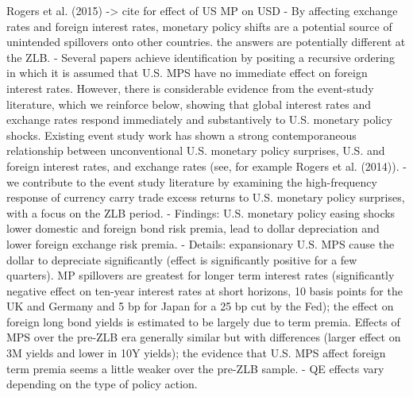 Rogers et al. (2015) -> cite for effect of US MP on USD
- By affecting exchange rates and foreign interest rates, monetary policy shifts are a
potential source of unintended spillovers onto other countries. the answers are potentially different at the ZLB.
- Several papers achieve identification by positing a recursive ordering in which it is assumed that U.S. MPS have no immediate effect on foreign interest rates. However, there is considerable evidence from the event-study literature, which we reinforce below, showing that global interest rates and exchange rates respond immediately and substantively to U.S. monetary policy shocks.
Existing event study work has shown a strong contemporaneous relationship between
unconventional U.S. monetary policy surprises, U.S. and foreign interest rates, and
exchange rates (see, for example Rogers et al. (2014)).
- we contribute to the event study literature by examining the high-frequency response of currency carry trade excess returns to U.S. monetary policy surprises, with a focus on the ZLB period. 
- Findings: U.S. monetary policy easing shocks lower domestic and foreign bond risk premia, lead to dollar depreciation and lower foreign exchange risk premia.
- Details: expansionary U.S. MPS cause the dollar to depreciate significantly (effect is significantly positive for a few quarters). MP spillovers are greatest for longer term interest rates (significantly negative effect on ten-year interest rates at short horizons, 10 basis points for the UK and Germany and 5 bp for Japan for a 25 bp cut by the Fed); the effect on foreign long bond yields is estimated to be largely due to term premia. Effects of MPS over the pre-ZLB era generally similar but with differences (larger effect on 3M yields and lower in 10Y yields); the evidence that U.S. MPS affect foreign term premia seems a little weaker over the pre-ZLB sample.
-  QE effects vary depending on the type of policy action.


